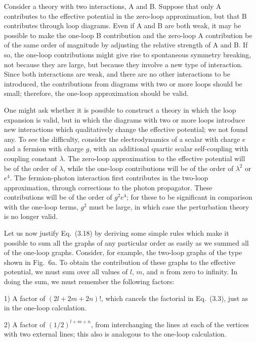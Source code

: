 \documentclass[12pt,epsf]{report}
\begin{document}
Consider a theory with two interactions, A and B.  Suppose that only A
contributes to the effective potential in the zero-loop approximation,
but that B contributes through loop diagrams.  Even if A and B are
both weak, it may be possible to make the one-loop B contribution and
the zero-loop A contribution be of the same order of magnitude by
adjusting the relative strength of A and B.  If so, the one-loop
contributions might give rise to spontaneous symmetry breaking, not
because they are large, but because they involve a new type of
interaction.  Since both interactions are weak, and there are no other
interactions to be introduced, the contributions from diagrams with
two or more loops should be small; therefore, the one-loop
approximation should be valid.

One might ask whether it is possible to construct a theory in which
the loop expansion is valid, but in which the diagrams with two or
more loops introduce new interactions which qualitatively change the
effective potential; we not found any.  To see the difficulty,
consider the electrodynamics of a scalar with charge $e$ and a fermion
with charge $g$, with an additional quartic scalar self-coupling with
coupling constant $\lambda$.  The zero-loop approximation to the
effective potential will be of the order of $\lambda$, while the
one-loop contributions will be of the order of $\lambda^2$ or $e^4$.
The fermion-photon interaction first contributes in the two-loop
approximation, through corrections to the photon propagator.  These
contributions will be of the order of $g^2e^4$; for these to be
significant in comparison with the one-loop terms, $g^2$ must be
large, in which case the perturbation theory is no longer valid.

Let us now justify Eq.~(3.18) by deriving some simple rules which make it 
possible to sum all the graphs of any particular order as easily as 
we summed all of the one-loop graphs.  Consider, for example, the two-loop
graphs of the type shown in Fig.~6a.  To obtain the contribution of 
these graphs to the effective potential, we must sum over all values 
of $l$, $m$, and $n$ from zero to infinity.  In doing the sum, we 
must remember the following factors:

1) A factor of $(2l + 2m +2n)!$, which cancels the factorial in 
Eq.~(3.3), just as in the one-loop calculation.

2)  A factor of $(1/2)^{l+m+n}$, from interchanging the lines at each of 
the vertices with two external lines; this also is analogous to 
the one-loop calculation.
\end{document}
